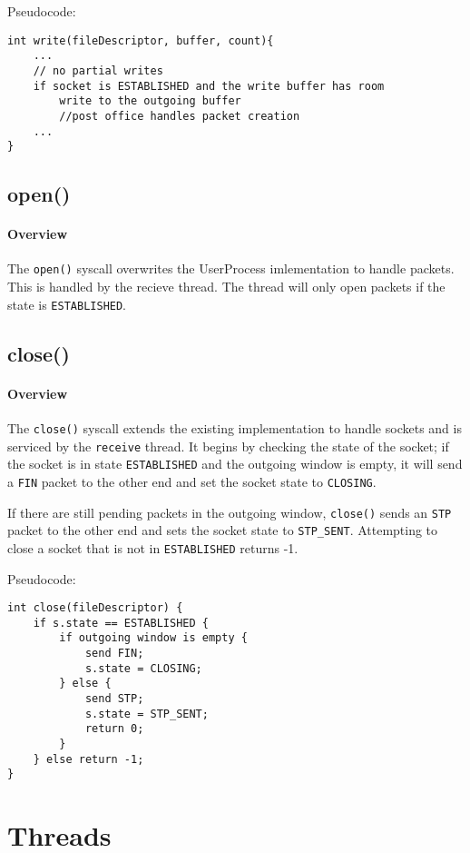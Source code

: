 \documentclass[]{article}
\begin{document}
\noindent Pseudocode: 

\begin{lstlisting}
int write(fileDescriptor, buffer, count){
	...
	// no partial writes
	if socket is ESTABLISHED and the write buffer has room
		write to the outgoing buffer
		//post office handles packet creation
	...
}
\end{lstlisting}

\subsection{open()}
\paragraph{Overview}
The \texttt{open()} syscall overwrites the UserProcess imlementation to handle packets. This is handled by the recieve thread. The thread will only open packets if the state is \texttt{ESTABLISHED}.
\subsection{close()}
\paragraph{Overview}
The \texttt{close()} syscall extends the existing implementation to handle sockets and is serviced by the \texttt{receive} thread. It begins by checking the state of the socket; if the socket is in state \texttt{ESTABLISHED} and the outgoing window is empty, it will send a \texttt{FIN} packet to the other end and set the socket state to \texttt{CLOSING}. 

If there are still pending packets in the outgoing window, \texttt{close()} sends an \texttt{STP} packet to the other end and sets the socket state to \texttt{STP\_SENT}. Attempting to close a socket that is not in \texttt{ESTABLISHED} returns -1.

\pagebreak

\noindent Pseudocode:

\begin{lstlisting}
int close(fileDescriptor) {
	if s.state == ESTABLISHED {
		if outgoing window is empty {
			send FIN;
			s.state = CLOSING;
		} else {
			send STP;
			s.state = STP_SENT;
			return 0;
		}
	} else return -1;
}
\end{lstlisting}


\section{Threads}
\end{document}
